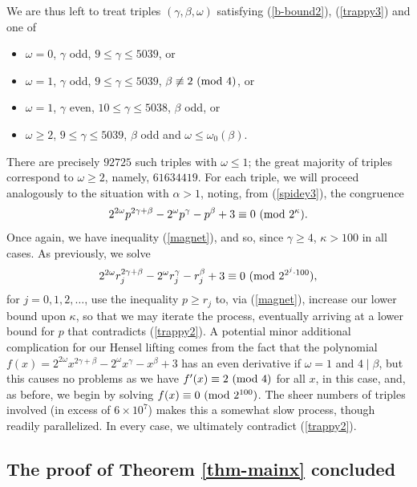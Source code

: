 \documentclass{amsart}
\def\mod#1{{\ifmmode\text{\rm\ (mod~$#1$)}
\else\discretionary{}{}{\hbox{ }}\rm(mod~$#1$)\fi}}
\begin{document}
{We are thus left to treat  triples $(\gamma,\beta, \omega)$ satisfying (\ref{b-bound2}), (\ref{trappy3})  and one of
\begin{itemize}
\item $\omega=0$, $\gamma$ odd, $9 \leq \gamma \leq 5039$, or
\item $\omega=1$, $\gamma$ odd, $9 \leq \gamma \leq 5039$, $\beta \not\equiv 2 \mod{4}$, or
\item $\omega=1$, $\gamma$ even, $10 \leq \gamma \leq 5038$, $\beta$ odd, or
\item $\omega \geq 2$,  $9 \leq \gamma \leq 5039$,  $\beta$ odd and $\omega \leq \omega_0(\beta)$.
\end{itemize}
There are precisely $92725$ such triples with $\omega \leq 1$; the great majority of triples correspond to $\omega \geq 2$, namely, $61634419$. For each triple, we will proceed analogously to the situation with $\alpha>1$, noting, from (\ref{spidey3}), the congruence 
\begin{equation} \label{fridge2}
2^{2\omega} p^{2\gamma+\beta} - 2^\omega p^\gamma - p^\beta+3  \equiv 0 \mod{2^\kappa}.
\end{equation}
Once again, we have inequality (\ref{magnet}), and so, since $\gamma \geq 4$, $\kappa > 100$ in all cases. As previously, we solve 
$$
2^{2\omega} r_j^{2\gamma+\beta} - 2^\omega r_j^\gamma - r_j^\beta+3  \equiv 0 \mod{2^{2^j \cdot 100}},
$$
for $j=0, 1, 2, \ldots$, use the inequality $p \geq r_j$ to, via (\ref{magnet}), increase our lower bound upon $\kappa$, so that we may iterate the process, eventually arriving at a lower bound for $p$ that contradicts (\ref{trappy2}). 
A potential  minor additional complication for our Hensel lifting comes from the fact that the polynomial  $f(x)=2^{2\omega} x^{2\gamma+\beta} - 2^\omega x^\gamma - x^\beta+3$  has an even derivative if $\omega=1$ and $4 \mid \beta$, but this causes no problems as 
we have $f^\prime (x) \equiv 2 \mod{4}$ for all $x$, in this case, and, as before, we begin by solving $f(x) \equiv 0 \mod{2^{100}}$. The sheer numbers of triples involved (in excess of $6 \times 10^7$)  makes this a somewhat slow process, though readily parallelized. In every case, we ultimately contradict (\ref{trappy2}).


 \subsection{The proof of Theorem \ref{thm-mainx} concluded}
 
}
\end{document}
